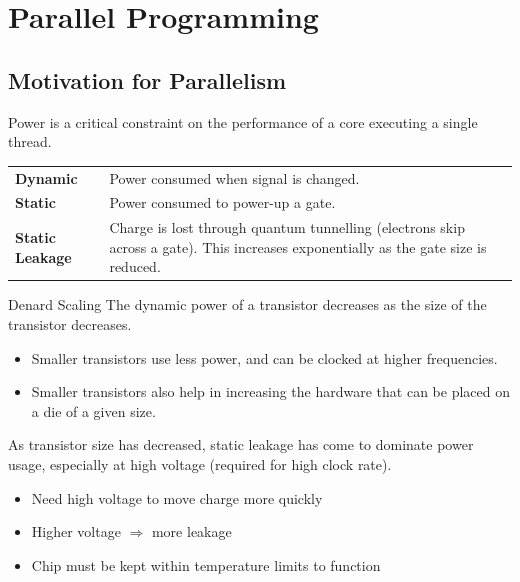 \chapter{Parallel Programming}

\section{Motivation for Parallelism}
Power is a critical constraint on the performance of a core executing a single thread.
\begin{center}
    \begin{tabular}{l p{}}
        \textbf{Dynamic} & Power consumed when signal is changed. \\
        \textbf{Static} & Power consumed to power-up a gate. \\
        \textbf{Static Leakage} & Charge is lost through quantum tunnelling (electrons skip across a gate). This increases exponentially as the gate size is reduced. \\
    \end{tabular}
\end{center}

\begin{definitionbox}{Denard Scaling}
    The dynamic power of a transistor decreases as the size of the transistor decreases.
    \begin{itemize}
        \item Smaller transistors use less power, and can be clocked at higher frequencies.
        \item Smaller transistors also help in increasing the hardware that can be placed on a die of a given size.
    \end{itemize}
\end{definitionbox}

As transistor size has decreased, static leakage has come to dominate power usage, especially at high voltage (required for high clock rate).
\begin{itemize}
    \item Need high voltage to move charge more quickly
    \item Higher voltage $\Rightarrow$ more leakage
    \item Chip must be kept within temperature limits to function
\end{itemize}

